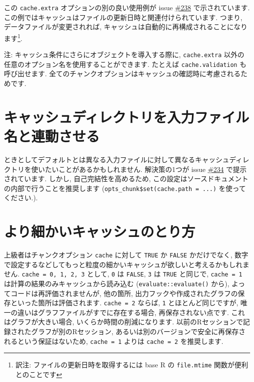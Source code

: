 \documentclass[
  lualatex,ja=standard,jafont=noto-otf]{bxjsreport}
\begin{document}
この \texttt{cache.extra} オプションの別の良い使用例が issue
\href{https://github.com/yihui/knitr/issues/238}{\#238}
で示されています.
この例ではキャッシュはファイルの更新日時と関連付けられています. つまり,
データファイルが変更されれば,
キャッシュは自動的に再構成されることになります\footnote{訳注:
  ファイルの更新日時を取得するには base R の \texttt{file.mtime}
  関数が便利とのことです}.

注: キャッシュ条件にさらにオブジェクトを導入する際に,
\texttt{cache.extra} 以外の任意のオプション名を使用することができます.
たとえば \texttt{cache.validation} も呼び出せます.
全てのチャンクオプションはキャッシュの確認時に考慮されるためです.

\hypertarget{ux30adux30e3ux30c3ux30b7ux30e5ux30c7ux30a3ux30ecux30afux30c8ux30eaux3092ux5165ux529bux30d5ux30a1ux30a4ux30ebux540dux3068ux9023ux52d5ux3055ux305bux308b}{%
\section*{キャッシュディレクトリを入力ファイル名と連動させる}\label{ux30adux30e3ux30c3ux30b7ux30e5ux30c7ux30a3ux30ecux30afux30c8ux30eaux3092ux5165ux529bux30d5ux30a1ux30a4ux30ebux540dux3068ux9023ux52d5ux3055ux305bux308b}}

ときとしてデフォルトとは異なる入力ファイルに対して異なるキャッシュディレクトリを使いたいことがあるかもしれません.
解決策の1つが issue
\href{https://github.com/yihui/knitr/issues/234}{\#234}
で提示されています. しかし, 自己完結性を高めるため,
この設定はソースドキュメントの内部で行うことを推奨します
(\texttt{opts\_chunk\$set(cache.path\ =\ ...)} を使ってください.).

\hypertarget{ux3088ux308aux7d30ux304bux3044ux30adux30e3ux30c3ux30b7ux30e5ux306eux3068ux308aux65b9}{%
\section*{より細かいキャッシュのとり方}\label{ux3088ux308aux7d30ux304bux3044ux30adux30e3ux30c3ux30b7ux30e5ux306eux3068ux308aux65b9}}

上級者はチャンクオプション \texttt{cache} に対して \texttt{TRUE} か
\texttt{FALSE} かだけでなく,
数字で設定するなどしてもっと粒度の細かいキャッシュが欲しいと考えるかもしれません.
\texttt{cache\ =\ 0,\ 1,\ 2,\ 3} として, \texttt{0} は \texttt{FALSE},
\texttt{3} は \texttt{TRUE} と同じで, \texttt{cache\ =\ 1}
は計算の結果のみキャッシュから読み込む (\texttt{evaluate::evaluate()}
から), よってコードは再評価されませんが, 他の箇所,
出力フックや作成されたグラフの保存といった箇所は評価されます.
\texttt{cache\ =\ 2} ならば, \texttt{1} とほとんど同じですが,
唯一の違いはグラフファイルがすでに存在する場合, 再保存されない点です.
これはグラフが大きい場合, いくらか時間の削減になります.
以前のRセッションで記録されたグラフが別のRセッション,
あるいは別のバージョンで安全に再保存されるという保証はないため,
\texttt{cache\ =\ 1} よりは \texttt{cache\ =\ 2} を推奨します.
\end{document}
